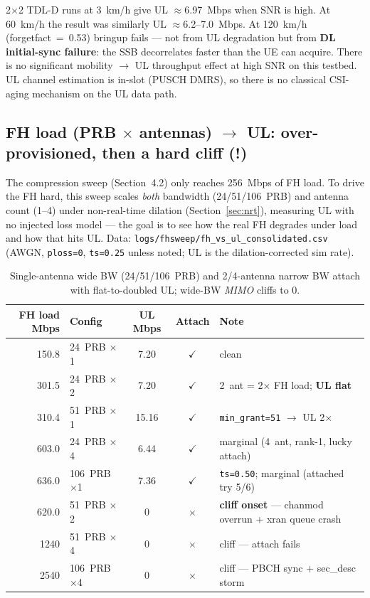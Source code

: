 \documentclass[11pt,a4paper]{article}
\newcommand{\yes}{\textcolor{closedcol}{\ensuremath{\checkmark}}}
\newcommand{\warn}{\textcolor{orange!85!black}{\textbf{(!)}}}
\newcommand{\no}{\textcolor{opencol}{\ensuremath{\times}}}
\begin{document}
2$\times$2 TDL-D runs at 3~km/h give UL $\approx$6.97~Mbps when SNR is high. At 60~km/h the
result was similarly UL $\approx$6.2--7.0~Mbps. At 120~km/h (forgetfact~=~0.53) bringup fails
--- not from UL
degradation but from \textbf{DL initial-sync failure}: the SSB decorrelates faster than
the UE can acquire. There is no significant mobility $\rightarrow$ UL throughput effect at
high SNR on this testbed. UL channel estimation is in-slot (PUSCH DMRS), so there is no
classical CSI-aging mechanism on the UL data path.

\subsection{FH load (PRB $\times$ antennas) $\rightarrow$ UL: over-provisioned, then a hard cliff
  \texorpdfstring{\warn}{[!]}}
\label{sec:fhload}

The compression sweep (Section~4.2) only reaches 256~Mbps of FH load. To drive the FH hard,
this sweep scales \emph{both} bandwidth (24/51/106~PRB) and antenna count (1--4) under
non-real-time dilation (Section~\ref{sec:nrt}), measuring UL with no injected loss model ---
the goal is to see how the real FH degrades under load and how that hits UL.
Data: \texttt{logs/fhsweep/fh\_vs\_ul\_consolidated.csv} (AWGN, \texttt{ploss=0},
\texttt{ts=0.25} unless noted; UL is the dilation-corrected sim rate).

\begin{table}[h]\centering\small
\begin{tabularx}{\linewidth}{@{}r l c c X@{}}
\toprule
\textbf{FH load Mbps} & \textbf{Config} & \textbf{UL Mbps} & \textbf{Attach} & \textbf{Note} \\
\midrule
150.8 & 24~PRB $\times$1  & 7.20  & \yes & clean \\
301.5 & 24~PRB $\times$2  & 7.20  & \yes & 2~ant = 2$\times$ FH load; \textbf{UL flat} \\
310.4 & 51~PRB $\times$1  & 15.16 & \yes & \texttt{min\_grant=51} $\rightarrow$ UL 2$\times$ \\
603.0 & 24~PRB $\times$4  & 6.44  & \yes & marginal (4~ant, rank-1, lucky attach) \\
636.0 & 106~PRB $\times$1 & 7.36  & \yes & \texttt{ts=0.50}; marginal (attached try 5/6) \\
620.0 & 51~PRB $\times$2  & 0     & \no  & \textbf{cliff onset} --- chanmod overrun + xran queue crash \\
1240  & 51~PRB $\times$4  & 0     & \no  & cliff --- attach fails \\
2540  & 106~PRB $\times$4 & 0     & \no  & cliff --- PBCH sync + sec\_desc storm \\
\bottomrule
\end{tabularx}
\caption*{\small Single-antenna wide BW (24/51/106~PRB) and 2/4-antenna narrow BW attach with
flat-to-doubled UL; wide-BW \emph{MIMO} cliffs to 0.}
\end{table}
\end{document}
